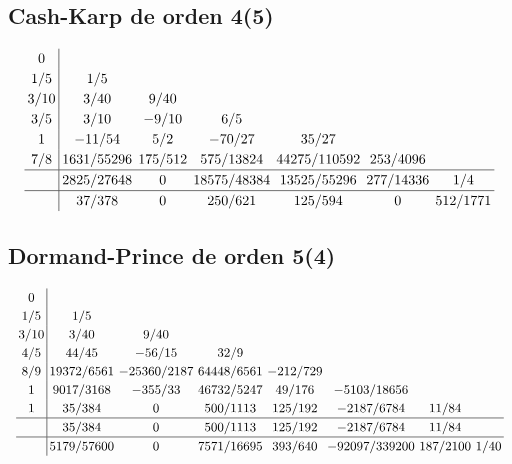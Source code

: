     \subsection{Cash-Karp de orden 4(5)}
    \vspace{-10pt}
        \begin{equation}\label{eq:cashkarp45}
            \arraycolsep=2.2pt
            \renewcommand\arraystretch{1.2}
            \begin{array}{c|cccccc}
            0\\
            1/5 & 1/5\\
            3/10 & 3/40 & 9/40\\
            3/5 & 3/10 & -9/10 & 6/5\\
            1 & -11/54 & 5/2 & -70/27 & 35/27\\
            7/8 & 1631/55296 & 175/512 & 575/13824 & 44275/110592 & 253/4096\\
            \hline
            & 2825/27648 & 0 & 18575/48384 & 13525/55296 & 277/14336 & 1/4\\
            \hline
            & 37/378 & 0 & 250/621 & 125/594 & 0 & 512/1771
            \end{array}
        \end{equation}
    
    
    \vfill

    \subsection{Dormand-Prince de orden 5(4)}
    \vspace{-10pt}
        \begin{equation}\label{eq:dopri54}
            \small
            \arraycolsep=1.65pt
            \renewcommand\arraystretch{1.2}
            \begin{array}{c|ccccccc}
            0\\
            1/5 & 1/5\\
            3/10 & 3/40 & 9/40\\
            4/5 & 44/45 & -56/15 & 32/9\\
            8/9 & 19372/6561 & -25360/2187 & 64448/6561 & -212/729\\
            1 & 9017/3168 & -355/33 & 46732/5247 & 49/176 & -5103/18656\\
            1 & 35/384 & 0 & 500/1113 & 125/192 & -2187/6784 & 11/84\\
            \hline
            & 35/384 & 0 & 500/1113 & 125/192 & -2187/6784 & 11/84\\
            \hline
            & 5179/57600 & 0 & 7571/16695 & 393/640 & -92097/339200 & 187/2100 & 1/40
            \end{array}
        \raisetag{3cm}
        \end{equation}

